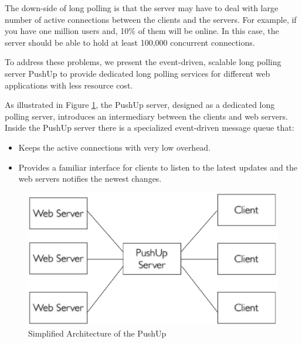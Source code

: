 The down-side of long polling is that the server may have to deal with large
number of active connections between the clients and the servers. For example,
if you have one million users and, 10\% of them will be online. In this case,
the server should be able to hold at least 100,000 concurrent connections.

To address these problems, we present the event-driven\cite{UnixBook}, scalable
long polling server PushUp to provide dedicated long polling services for 
different web applications with less resource cost.

As illustrated in Figure \ref{fig:sim_pushup}, the PushUp server, designed
as a dedicated long polling server, introduces an intermediary between
the clients and web servers. Inside the PushUp server there is a specialized 
event-driven message queue that:
\begin {itemize}
    \item[1] Keeps the active connections with very low overhead.
    \item[2] Provides a familiar interface for clients to listen to the latest 
             updates and the web servers notifies the newest changes.
\end {itemize}


\begin{figure}[htb!]
\centering
    \includegraphics[scale=0.40]{figures/sim_pushup.eps}
    \caption{Simplified Architecture of the PushUp}
    \label{fig:sim_pushup}
\end{figure}
